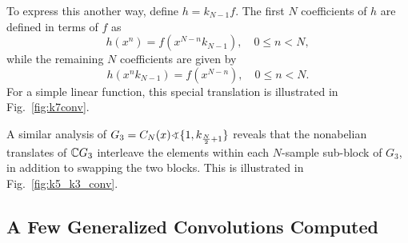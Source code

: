 %
%

To express this another way, define $h=k_{N-1}f$. 
The first $N$ coefficients of $h$ are defined in terms of $f$ as
\[
h(x^n)= f(x^{N-n} k_{N-1}), \quad 0\leq n < N,
\]
while the remaining $N$ coefficients are given by
\[
h(x^n k_{N-1}) = f(x^{N-n}), \quad 0\leq n < N.
\]
For a simple linear function, this special translation is
illustrated in Fig.~\ref{fig:k7conv}.


A similar analysis of $G_3 = C_N(x) \sdp \{1,
k_{\frac{N}{2} + 1}\}$ reveals
that the nonabelian translates of $\mathbb{C} G_3$ interleave the 
elements within each $N$-sample sub-block of $G_3$, 
in addition to swapping the two blocks.
This is illustrated in Fig.~\ref{fig:k5_k3_conv}.

\subsection{A Few Generalized Convolutions Computed}

